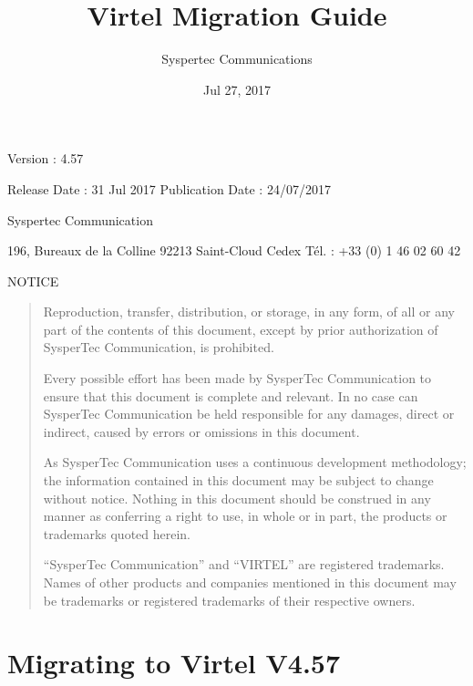 \documentclass[letterpaper,10pt,english]{sphinxmanual}
\title{Virtel Migration Guide}
\date{Jul 27, 2017}
\author{Syspertec Communications}
\begin{document}
\maketitle
\sphinxtableofcontents
{}\label{\detokenize{Migration_Guide::doc}}



Version : 4.57

Release Date : 31 Jul 2017 Publication Date : 24/07/2017

Syspertec Communication

196, Bureaux de la Colline 92213 Saint-Cloud Cedex Tél. : +33 (0) 1 46 02 60 42


NOTICE
\begin{quote}

Reproduction, transfer, distribution, or storage, in any form, of all or any part of
the contents of this document, except by prior authorization of SysperTec
Communication, is prohibited.

Every possible effort has been made by SysperTec Communication to ensure that this document
is complete and relevant. In no case can SysperTec Communication be held responsible for
any damages, direct or indirect, caused by errors or omissions in this document.

As SysperTec Communication uses a continuous development methodology; the information
contained in this document may be subject to change without notice. Nothing in this
document should be construed in any manner as conferring a right to use, in whole or in
part, the products or trademarks quoted herein.

“SysperTec Communication” and “VIRTEL” are registered trademarks. Names of other products
and companies mentioned in this document may be trademarks or registered trademarks of
their respective owners.
\end{quote}

\newpage


\chapter{Migrating to Virtel V4.57}
\label{\detokenize{Migration_Guide:v457mi-introduction}}\label{\detokenize{Migration_Guide:index-0}}\label{\detokenize{Migration_Guide:migrating-to-virtel-v4-57}}\label{\detokenize{Migration_Guide:migration-guide-v4-57}}\label{\detokenize{Migration_Guide:virtel457mi}}
\end{document}
